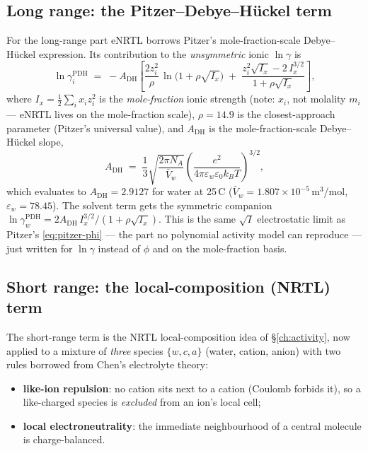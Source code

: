 \documentclass[11pt,a4paper]{article}
\begin{document}
\subsection{Long range: the Pitzer--Debye--H\"uckel term}

For the long-range part eNRTL borrows Pitzer's mole-fraction-scale
Debye--H\"uckel expression.  Its contribution to the \emph{unsymmetric}
ionic $\ln\gamma$ is
\begin{equation}
   \ln\gamma_i^{\mathrm{PDH}}
   \;=\;
   -A_{\mathrm{DH}}
   \left[
      \frac{2 z_i^{2}}{\rho}\,\ln\!\bigl(1 + \rho\sqrt{I_x}\bigr)
      \;+\;
      \frac{z_i^{2}\sqrt{I_x} - 2\,I_x^{3/2}}{1 + \rho\sqrt{I_x}}
   \right],
   \label{eq:enrtl-pdh}
\end{equation}
where $I_x = \tfrac12\sum_i x_i z_i^{2}$ is the \emph{mole-fraction}
ionic strength (note: $x_i$, not molality $m_i$ --- eNRTL lives on the
mole-fraction scale), $\rho = 14.9$ is the closest-approach parameter
(Pitzer's universal value), and $A_{\mathrm{DH}}$ is the
mole-fraction-scale Debye--H\"uckel slope,
\begin{equation}
   A_{\mathrm{DH}}
   \;=\;
   \frac13
   \sqrt{\frac{2\pi N_{\!A}}{\bar V_w}}
   \left(\frac{e^{2}}{4\pi\varepsilon_w\varepsilon_0 k_B T}\right)^{\!3/2},
   \label{eq:enrtl-ADH}
\end{equation}
which evaluates to $A_{\mathrm{DH}} = 2.9127$ for water at 25\,\textdegree C
($\bar V_w = 1.807\times10^{-5}$\,m$^3$/mol, $\varepsilon_w = 78.45$).
The solvent term gets the symmetric companion
$\ln\gamma_w^{\mathrm{PDH}} = 2 A_{\mathrm{DH}}\,I_x^{3/2}/(1+\rho\sqrt{I_x})$.
This is the same $\sqrt I$ electrostatic limit as Pitzer's
\eqref{eq:pitzer-phi} --- the part no polynomial activity model can
reproduce --- just written for $\ln\gamma$ instead of $\phi$ and on the
mole-fraction basis.

\subsection{Short range: the local-composition (NRTL) term}

The short-range term is the NRTL local-composition idea of
\S\ref{ch:activity}, now applied to a mixture of \emph{three} species
$\{w, c, a\}$ (water, cation, anion) with two rules borrowed from
Chen's electrolyte theory:

\begin{itemize}[leftmargin=*,nosep,topsep=2pt]
  \item \textbf{like-ion repulsion}: no cation sits next to a cation
        (Coulomb forbids it), so a like-charged species is \emph{excluded}
        from an ion's local cell;
  \item \textbf{local electroneutrality}: the immediate neighbourhood of
        a central molecule is charge-balanced.
\end{itemize}
\end{document}
